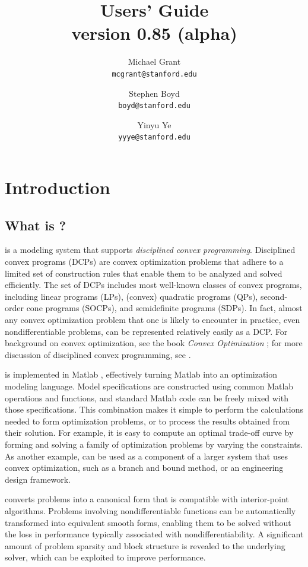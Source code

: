 \documentclass[12pt]{article}
\title{\cvx Users' Guide\\\large version 0.85 (alpha)}
\author{Michael Grant\\\texttt{mcgrant@stanford.edu} 
\and Stephen Boyd\\\texttt{boyd@stanford.edu}
\and Yinyu Ye\\\texttt{yyye@stanford.edu}}
\begin{document}
\maketitle
\tableofcontents

\section{Introduction}

\subsection{What is \cvx?}

\cvx is a modeling system that supports \emph{disciplined convex 
programming}. Disciplined convex programs (DCPs) are convex optimization
problems that adhere to a limited set of construction rules that enable
them to be analyzed and solved efficiently. The set of DCPs
includes most well-known classes of convex programs, including
linear programs (LPs), (convex) quadratic programs (QPs), second-order
cone programs (SOCPs), and semidefinite programs (SDPs).
In fact, almost any convex optimization problem
that one is likely to encounter in practice, even 
nondifferentiable problems, can be represented relatively
easily as a DCP. For background on convex optimization, see the book 
\emph{Convex Optimization} \cite{BV:04}; for more discussion 
of disciplined convex programming, see \cite{GBY,Gra:04}.

\cvx is implemented in Matlab \cite{MATLAB}, effectively
turning Matlab into an optimization modeling language.
Model specifications are constructed using common Matlab
operations and functions, and standard Matlab code can be
freely mixed with those specifications. This combination
makes it simple to perform the calculations
needed to form optimization problems, or to process the
results obtained from their solution. For example, it is easy
to compute an optimal trade-off curve
by forming and solving a family of optimization problems
by varying the constraints. As another example, \cvx can
be used as a component of a larger system that uses convex
optimization, such as a branch and bound method,
or an engineering design framework.

\cvx converts problems into a canonical form that is compatible
with interior-point algorithms. Problems involving nondifferentiable 
functions can be automatically transformed into equivalent smooth forms,
enabling them to be solved without the loss in performance typically
associated with nondifferentiability.
A significant amount of problem sparsity and block
structure is revealed to the underlying solver, which can be
exploited to improve performance.
\end{document}
